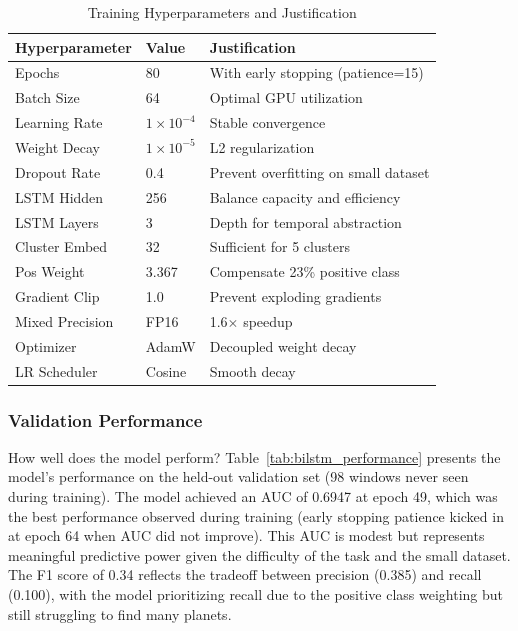 \documentclass[letterpaper]{article} %
\begin{document}
\begin{table}[h]
\centering
\caption{Training Hyperparameters and Justification}
\label{tab:bilstm_hyperparams}
\begin{tabular}{@{}llp{5.5cm}@{}}
\toprule
\textbf{Hyperparameter} & \textbf{Value} & \textbf{Justification} \\
\midrule
Epochs & 80 & With early stopping (patience=15) \\
Batch Size & 64 & Optimal GPU utilization \\
Learning Rate & $1 \times 10^{-4}$ & Stable convergence \\
Weight Decay & $1 \times 10^{-5}$ & L2 regularization \\
Dropout Rate & 0.4 & Prevent overfitting on small dataset \\
LSTM Hidden & 256 & Balance capacity and efficiency \\
LSTM Layers & 3 & Depth for temporal abstraction \\
Cluster Embed & 32 & Sufficient for 5 clusters \\
Pos Weight & 3.367 & Compensate 23\% positive class \\
Gradient Clip & 1.0 & Prevent exploding gradients \\
Mixed Precision & FP16 & 1.6$\times$ speedup \\
Optimizer & AdamW & Decoupled weight decay \\
LR Scheduler & Cosine & Smooth decay \\
\bottomrule
\end{tabular}
\end{table}

\subsubsection{Validation Performance}

How well does the model perform? Table~\ref{tab:bilstm_performance} presents the model's performance on the held-out validation set (98 windows never seen during training). The model achieved an AUC of 0.6947 at epoch 49, which was the best performance observed during training (early stopping patience kicked in at epoch 64 when AUC did not improve). This AUC is modest but represents meaningful predictive power given the difficulty of the task and the small dataset. The F1 score of 0.34 reflects the tradeoff between precision (0.385) and recall (0.100), with the model prioritizing recall due to the positive class weighting but still struggling to find many planets.
\end{document}
